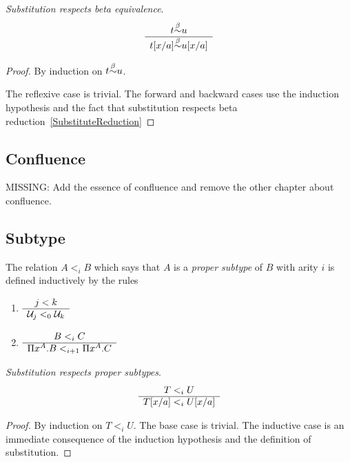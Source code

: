 \begin{theorem}
    \label{thm:SubstitutionRespectsEquivalence}
    \emph{Substitution respects beta equivalence}.
    $$
    \ruleh{
        t \betaeq u
    }
    { \sub a x t \betaeq \sub a x u}
    $$
    \begin{proof}
        By induction on $t \betaeq u$.

        The reflexive case is trivial. The forward and backward cases use the
        induction hypothesis and the fact that substitution respects beta
        reduction~\ref{SubstituteReduction}
    \end{proof}
\end{theorem}



\subsection{Confluence}

MISSING: Add the essence of confluence and remove the other chapter about
confluence.



\subsection{Subtype}



\begin{definition}
    \label{def:ProperSubtype}
    The relation $A <_i B$ which says that $A$ is a \emph{proper subtype} of $B$
    with arity $i$ is defined inductively by the rules
    \begin{enumerate}
        \item $\ruleh{j < k} {\Any_j <_0 \Any_k}$

        \item $\ruleh{B <_i C} {\Pi x^A. B <_{i+1} \Pi x^A. C}$
    \end{enumerate}
\end{definition}


\begin{theorem}
    \label{thm:SubstitutionRespectsProperSubtype}
    \emph{Substitution respects proper subtypes}.
    $$
    \ruleh{
        T <_i U
    }
    {
        \sub a x T <_i \sub a x U
    }
    $$
    \begin{proof}
        By induction on $T <_i U$. The base case is trivial. The inductive case
        is an immediate consequence of the induction hypothesis and the
        definition of substitution.
    \end{proof}
\end{theorem}


